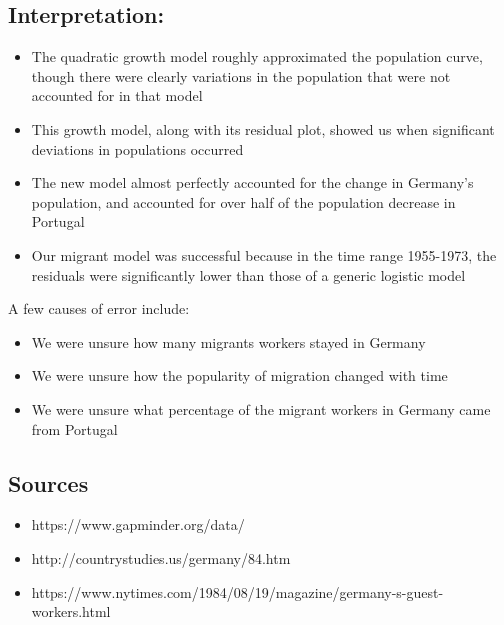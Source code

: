 \documentclass[11pt]{article}
\providecommand{\tightlist}{%
      \setlength{\itemsep}{0pt}\setlength{\parskip}{0pt}}
\begin{document}
    \hypertarget{interpretation}{%
\subsection{Interpretation:}\label{interpretation}}

\begin{itemize}
\tightlist
\item
  The quadratic growth model roughly approximated the population curve,
  though there were clearly variations in the population that were not
  accounted for in that model
\item
  This growth model, along with its residual plot, showed us when
  significant deviations in populations occurred
\item
  The new model almost perfectly accounted for the change in Germany's
  population, and accounted for over half of the population decrease in
  Portugal
\item
  Our migrant model was successful because in the time range 1955-1973,
  the residuals were significantly lower than those of a generic
  logistic model
\end{itemize}

A few causes of error include:

\begin{itemize}
\tightlist
\item
  We were unsure how many migrants workers stayed in Germany
\item
  We were unsure how the popularity of migration changed with time
\item
  We were unsure what percentage of the migrant workers in Germany came
  from Portugal
\end{itemize}

    \hypertarget{sources}{%
\subsection{Sources}\label{sources}}

\begin{itemize}
\tightlist
\item
  https://www.gapminder.org/data/
\item
  http://countrystudies.us/germany/84.htm
\item
  https://www.nytimes.com/1984/08/19/magazine/germany-s-guest-workers.html
\end{itemize}


    
    
    
    
\end{document}
